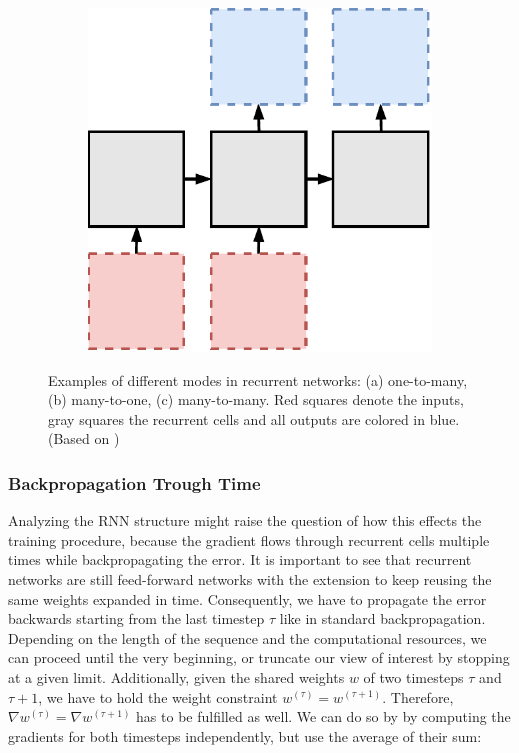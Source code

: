 \begin{figure}[htpb]
\begin{subfigure}{0.3\textwidth}
  \centering
  \includegraphics[width=.8\linewidth]{figures/many2many.pdf}
  \caption{}
  \label{fig:rnn-many2many}
\end{subfigure}
\caption[Modes in recurrent networks]{Examples of different modes in recurrent networks: (a) one-to-many, (b) many-to-one, (c) many-to-many. Red squares denote the inputs, gray squares the recurrent cells and all outputs are colored in blue. (Based on \parencite{rnn-effectiveness})}
\label{fig:rnn-modes}
\end{figure}


\subsubsection{Backpropagation Trough Time}

Analyzing the RNN structure might raise the question of how this effects the training procedure, because the gradient flows through recurrent cells multiple times while backpropagating the error. It is important to see that recurrent networks are still feed-forward networks with the extension to keep reusing the same weights expanded in time. Consequently, we have to propagate the error backwards starting from the last timestep $ \tau $ like in standard backpropagation. Depending on the length of the sequence and the computational resources, we can proceed until the very beginning, or truncate our view of interest by stopping at a given limit. Additionally, given the shared weights $ w $ of two timesteps $\tau $ and $ \tau+1 $, we have to hold the weight constraint $ w^{(\tau)} = w^{(\tau+1)} $. Therefore, $ \nabla w^{(\tau)} = \nabla w^{(\tau+1)} $ has to be fulfilled as well. We can do so by by computing the gradients for both timesteps independently, but use the average of their sum:

